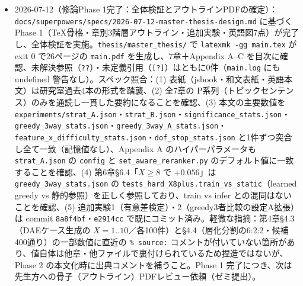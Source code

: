 \documentclass[11pt,a4paper]{jsarticle}
\begin{document}
\begin{itemize}[nosep]
  \item 2026-07-12（修論Phase 1完了：全体検証とアウトラインPDFの確定）：\texttt{docs/superpowers/specs/2026-07-12-master-thesis-design.md} に基づく Phase 1（TeX骨格・章別3階層アウトライン・追加実験・英語図7点）が完了し、全体検証を実施。\texttt{thesis/master\_thesis/} で \texttt{latexmk -gg main.tex} が exit 0 で26ページの \texttt{main.pdf} を生成し、7章＋Appendix A--C を目次に確認、未解決参照（\texttt{??}）・未定義引用（\texttt{[?]}）はともに0件（\texttt{main.log} にも undefined 警告なし）。スペック照合：(1) 表紙（jsbook・和文表紙・英語本文）は研究室過去4本の形式を踏襲、(2) 全7章の P系列（トピックセンテンス）のみを通読し一貫した要約になることを確認、(3) 本文の主要数値を \texttt{experiments/strat\_A.json}・\texttt{strat\_B.json}・\texttt{significance\_stats.json}・\texttt{greedy\_3way\_stats.json}・\texttt{greedy\_3way\_A\_stats.json}・\texttt{feature\_x\_difficulty\_stats.json}・\texttt{dof\_stop\_stats.json} と1件ずつ突合し全て一致（記憶値なし）、Appendix A のハイパーパラメータも \texttt{strat\_A.json} の \texttt{config} と \texttt{set\_aware\_reranker.py} のデフォルト値に一致することを確認、(4) 第6章§6.4「$X\ge8$ で $+0.056$」は \texttt{greedy\_3way\_stats.json} の \texttt{tests\_hard\_X8plus.train\_vs\_static}（learned greedy vs 静的参照）を正しく参照しており、train vs infer との混同はないことを確認、(5) 追加実験1（有意差検定）・2（greedy3者比較の設定A拡張）は commit \texttt{8a8f4bf}・\texttt{e2914cc} で既にコミット済み。軽微な指摘：第4章§4.3（DAEケース生成の $X=1..10$／各100件）と§4.4（層化分割の6:2:2・候補400通り）の一部数値に直近の \texttt{\% source:} コメントが付いていない箇所があり、値自体は他章・他ファイルで裏付けられているため捏造ではないが、Phase 2 の本文化時に出典コメントを補うこと。Phase 1 完了につき、次は先生方への骨子（アウトライン）PDFレビュー依頼（ゼミ提出）。

\end{itemize}
\end{document}
